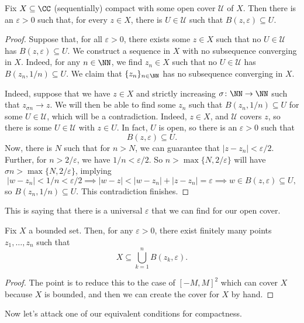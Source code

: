 \begin{lemma} \label{lem:singleepsilon}
	Fix $X\subseteq\CC$ (sequentially) compact with some open cover $\mathcal U$ of $X$. Then there is an $\varepsilon>0$ such that, for every $z\in X$, there is $U\in\mathcal U$ such that $B(z,\varepsilon)\subseteq U$.
\end{lemma}
\begin{proof}
	Suppose that, for all $\varepsilon>0$, there exists some $z\in X$ such that no $U\in\mathcal U$ has $B(z,\varepsilon)\subseteq U$. We construct a sequence in $X$ with no subsequence converging in $X$. Indeed, for any $n\in\NN$, we find $z_n\in X$ such that no $U\in\mathcal U$ has $B(z_n,1/n)\subseteq U$. We claim that $\{z_n\}_{n\in\NN}$ has no subsequence converging in $X$.

	Indeed, suppose that we have $z\in X$ and strictly increasing $\sigma\colon \NN\to\NN$ such that $z_{\sigma n}\to z$. We will then be able to find some $z_n$ such that $B(z_n,1/n)\subseteq U$ for some $U\in\mathcal U$, which will be a contradiction. Indeed, $z\in X$, and $\mathcal U$ covers $z$, so there is some $U\in\mathcal U$ with $z\in U$. In fact, $U$ is open, so there is an $\varepsilon>0$ such that
	\[B(z,\varepsilon)\subseteq U.\]
	Now, there is $N$ such that for $n>N$, we can guarantee that $|z-z_n|<\varepsilon/2$. Further, for $n>2/\varepsilon$, we have $1/n<\varepsilon/2$. So $n>\max\{N,2/\varepsilon\}$ will have $\sigma n>\max\{N,2/\varepsilon\}$, implying
	\[|w-z_n|<1/n<\varepsilon/2\implies|w-z|<|w-z_n|+|z-z_n|=\varepsilon\implies w\in B(z,\varepsilon)\subseteq U,\]
	so $B(z_n,1/n)\subseteq U$. This contradiction finishes.
\end{proof}
This is saying that there is a universal $\varepsilon$ that we can find for our open cover.
\begin{lemma} \label{lem:easycover}
	Fix $X$ a bounded set. Then, for any $\varepsilon>0$, there exist finitely many points $z_1,\ldots,z_n$ such that
	\[X\subseteq\bigcup_{k=1}^nB(z_k,\varepsilon).\]
\end{lemma}
\begin{proof}
	The point is to reduce this to the case of $[-M,M]^2$ which can cover $X$ because $X$ is bounded, and then we can create the cover for $X$ by hand.
\end{proof}
Now let's attack one of our equivalent conditions for compactness.
\closedbounded*
